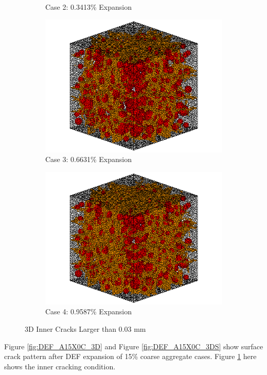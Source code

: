 \begin{figure}[!h]
\begin{subfigure}{.5\textwidth}
    \caption{Case 2: 0.3413\% Expansion}
    \end{subfigure}%
    \begin{subfigure}{.5\textwidth}
      \centering
      \includegraphics[width=.8\linewidth]{Files/exp_3D/DEF/A15X0C_3_c.png}
    \caption{Case 3: 0.6631\% Expansion}
    \end{subfigure}
    \begin{subfigure}{.5\textwidth}
      \centering
      \includegraphics[width=.8\linewidth]{Files/exp_3D/DEF/A15X0C_4_c.png}
    \caption{Case 4: 0.9587\% Expansion}
    \end{subfigure}%

  \caption{3D Inner Cracks Larger than 0.03 mm}
  \label{fig:DEF_A15X0C_cracddk}
\end{figure}


Figure \ref{fig:DEF_A15X0C_3D} and Figure \ref{fig:DEF_A15X0C_3DS} show surface crack pattern after DEF expansion of 15\% coarse aggregate cases. Figure \ref{fig:DEF_A15X0C_cracddk} here shows the inner cracking condition.

